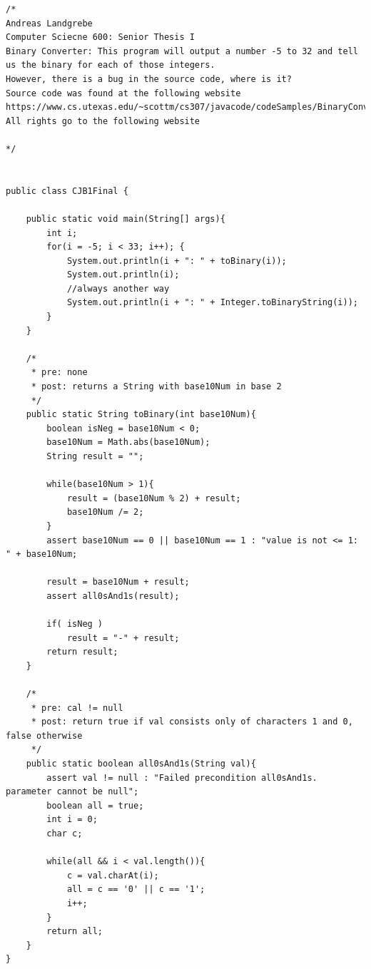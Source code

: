 \begin{lstlisting}
/*
Andreas Landgrebe
Computer Sciecne 600: Senior Thesis I
Binary Converter: This program will output a number -5 to 32 and tell us the binary for each of those integers.
However, there is a bug in the source code, where is it?
Source code was found at the following website
https://www.cs.utexas.edu/~scottm/cs307/javacode/codeSamples/BinaryConverter.java
All rights go to the following website

*/


public class CJB1Final {
    
    public static void main(String[] args){
    	int i;
        for(i = -5; i < 33; i++); {
            System.out.println(i + ": " + toBinary(i));
            System.out.println(i);
            //always another way
            System.out.println(i + ": " + Integer.toBinaryString(i));
        }
    }
    
    /*
     * pre: none
     * post: returns a String with base10Num in base 2
     */
    public static String toBinary(int base10Num){
        boolean isNeg = base10Num < 0;
        base10Num = Math.abs(base10Num);        
        String result = "";
        
        while(base10Num > 1){
            result = (base10Num % 2) + result;
            base10Num /= 2;
        }
        assert base10Num == 0 || base10Num == 1 : "value is not <= 1: " + base10Num;
        
        result = base10Num + result;
        assert all0sAnd1s(result);
        
        if( isNeg )
            result = "-" + result;
        return result;
    }
    
    /*
     * pre: cal != null
     * post: return true if val consists only of characters 1 and 0, false otherwise
     */
    public static boolean all0sAnd1s(String val){
        assert val != null : "Failed precondition all0sAnd1s. parameter cannot be null";
        boolean all = true;
        int i = 0;
        char c;
        
        while(all && i < val.length()){
            c = val.charAt(i);
            all = c == '0' || c == '1';
            i++;
        }
        return all;
    }
}

\end{lstlisting}

